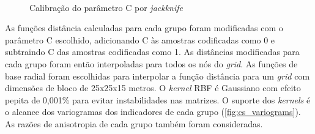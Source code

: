 \begin{figure}[H]
    \caption{Calibração do parâmetro C por \textit{jackknife}} \label{fig:uncert_groups}
     \centering
     \\
\end{figure}

As funções distância calculadas para cada grupo foram modificadas com o parâmetro C escolhido, adicionando C às amostras codificadas como 0 e subtraindo C das amostras codificadas como 1. As distâncias modificadas para cada grupo foram então interpoladas para todos os nós do \textit{grid}. As funções de base radial foram escolhidas para interpolar a função distância para um \textit{grid} com dimensões de bloco de 25x25x15 metros. O \textit{kernel} RBF é Gaussiano com efeito pepita de 0,001\% para evitar instabilidades nas matrizes. O suporte dos \textit{kernels} é o alcance dos variogramas dos indicadores de cada grupo (\autoref{fig:cs_variograms}). As razões de anisotropia de cada grupo também foram consideradas.

